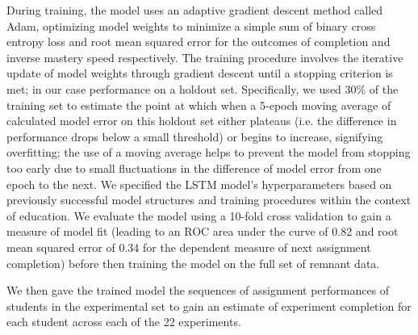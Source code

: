 During training, the model uses an adaptive gradient
descent method called Adam, optimizing model weights to minimize a
simple sum of binary cross entropy loss and root mean squared error
for the outcomes of completion and inverse mastery speed
respectively.
The training procedure involves the iterative update of model weights
through gradient descent until a stopping criterion is met; in our
case performance on a holdout set. Specifically, we used 30\% of the
training set to estimate the point at which when a 5-epoch moving
average of calculated
model error on this holdout set either plateaus (i.e. the difference
in performance drops below a small threshold) or begins to increase,
signifying overfitting; the use of a moving average helps to prevent
the model from stopping too early due to small fluctuations in the
difference of model error from one epoch to the next.
We specified the LSTM model's hyperparameters
based on previously successful model structures and training
procedures within the context of education.
We evaluate the model using a 10-fold cross validation to gain a
measure of model fit (leading to an ROC area under the curve of 0.82
and root mean squared error of 0.34 for the dependent measure of next
assignment completion) before then training the model on the full set
of remnant data.

We then gave the trained model the sequences of assignment
performances of students in the experimental set to gain an estimate
of experiment completion for each student across each of the 22
experiments.
